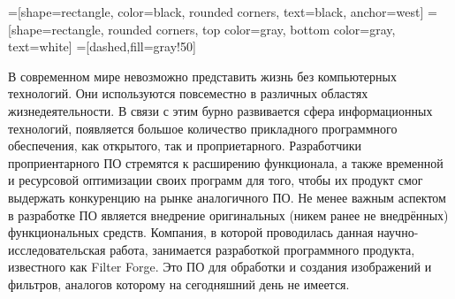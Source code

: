 


    =[shape=rectangle, color=black, rounded corners,%
    text=black, anchor=west]
    =[shape=rectangle, rounded corners,%
    top color=gray,%
    bottom color=gray, text=white]
    =[dashed,fill=gray!50]



\Intro
В современном мире невозможно представить жизнь без компьютерных технологий. Они используются повсеместно в различных областях жизнедеятельности. В связи с этим бурно развивается сфера информационных технологий, появляется большое количество прикладного программного обеспечения, как открытого, так и проприетарного. Разработчики проприентарного ПО стремятся к расширению функционала, а также временной и ресурсовой оптимизации своих программ для того, чтобы их продукт смог выдержать конкуренцию на рынке аналогичного ПО. Не менее важным аспектом в разработке ПО является внедрение оригинальных (никем ранее не внедрённых) функциональных средств. Компания, в которой проводилась данная научно-исследовательская работа, занимается разработкой программного продукта, известного как Filter Forge. Это ПО для обработки и создания изображений и фильтров, аналогов которому на сегодняшний день не имеется.


